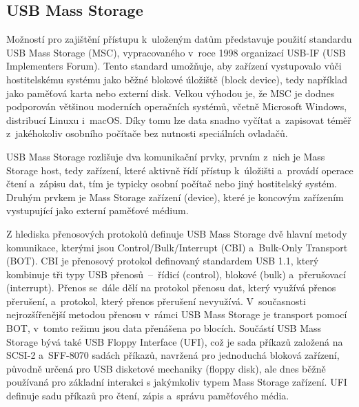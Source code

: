 
\subsection{USB Mass Storage}
\label{usb_mass_storage}
Možností pro zajištění přístupu k~uloženým datům představuje použití standardu USB Mass Storage (MSC), vypracovaného v~roce 1998 organizací USB-IF (USB Implementers Forum). Tento standard umožňuje, aby zařízení vystupovalo vůči hostitelskému systému jako běžné blokové úložiště (block device), tedy například jako paměťová karta nebo externí disk. Velkou výhodou je, že MSC je dodnes podporován většinou moderních operačních systémů, včetně Microsoft Windows, distribucí Linuxu i~macOS. Díky tomu lze data snadno vyčítat a~zapisovat téměř z~jakéhokoliv osobního počítače bez nutnosti speciálních ovladačů.~\cite{usb_standard_ufi, silicon_labs_mass_storage_protocol}

USB Mass Storage rozlišuje dva komunikační prvky, prvním z~nich je Mass Storage host, tedy zařízení, které aktivně řídí přístup k~úložišti a~provádí operace čtení a~zápisu dat, tím je typicky osobní počítač nebo jiný hostitelský systém. Druhým prvkem je Mass Storage zařízení (device), které je koncovým zařízením vystupující jako externí paměťové médium.~\cite{usb_standard_ufi, silicon_labs_mass_storage_protocol}

Z hlediska přenosových protokolů definuje USB Mass Storage dvě hlavní metody komunikace, kterými jsou Control/Bulk/Interrupt (CBI) a~Bulk-Only Transport (BOT). CBI je přenosový protokol definovaný standardem USB 1.1, který kombinuje tři typy USB přenosů~--~řídicí (control), blokové (bulk) a~přerušovací (interrupt). Přenos se~dále dělí na protokol přenosu dat, který využívá přenos přerušení, a~protokol, který přenos přerušení nevyužívá. V~současnosti nejrozšířenější metodou přenosu v~rámci USB Mass Storage je transport pomocí BOT, v~tomto režimu jsou data přenášena po blocích.
Součástí USB Mass Storage bývá také USB Floppy Interface (UFI), což je sada příkazů založená na SCSI-2 a~SFF-8070 sadách příkazů, navržená pro jednoduchá bloková zařízení, původně určená pro USB disketové mechaniky (floppy disk), ale dnes běžně používaná pro základní interakci s jakýmkoliv typem Mass Storage zařízení. UFI definuje sadu příkazů pro čtení, zápis a~správu paměťového média.~\cite{usb_standard_ufi}

